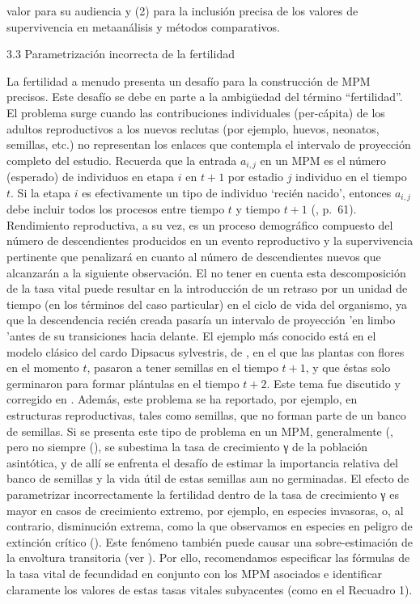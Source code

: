 \documentclass[
]{book}
\theoremstyle{definition}
\theoremstyle{definition}
\theoremstyle{definition}
\theoremstyle{definition}
\theoremstyle{remark}
\begin{document}
valor para su audiencia y (2) para la inclusión precisa de los valores de supervivencia en metaanálisis y métodos comparativos.

3.3 \textbar{} Parametrización incorrecta de la fertilidad

La fertilidad a menudo presenta un desafío para la construcción de MPM precisos. Este desafío se debe en parte a la ambigüedad del término ``fertilidad''. El problema surge cuando las contribuciones individuales (per-cápita) de los adultos reproductivos a los nuevos reclutas (por ejemplo, huevos, neonatos, semillas, etc.) no representan los enlaces que contempla el intervalo de proyección completo del estudio. Recuerda que la entrada \(a_{i,j}\) en un MPM es el número (esperado) de individuos en etapa \(i\) en \(t + 1\) por estadio \(j\) individuo en el tiempo \(t\). Si la etapa \(i\) es efectivamente un tipo de individuo `recién nacido', entonces \(a_{i,j}\) debe incluir todos los procesos entre tiempo \(t\) y tiempo \(t + 1\) (\citet{caswell2001matrix}, p.~61). Rendimiento reproductiva, a su vez, es un proceso demográfico compuesto del número de descendientes producidos en un evento reproductivo y la supervivencia pertinente que penalizará en cuanto al número de descendientes nuevos que alcanzarán a la siguiente observación. El no tener en cuenta esta descomposición de la tasa vital puede resultar en la introducción de un retraso por un unidad de tiempo (en los términos del caso particular) en el ciclo de vida del organismo, ya que la descendencia recién creada pasaría un intervalo de proyección 'en limbo 'antes de su transiciones hacia delante. El ejemplo más conocido está en el modelo clásico del cardo Dipsacus sylvestris, de \citet{werner1977population}, en el que las plantas con flores en el momento \(t\), pasaron a tener semillas en el tiempo \(t + 1\), y que éstas solo germinaron para formar plántulas en el tiempo \(t + 2\). Este tema fue discutido y corregido en \citet{caswell2001matrix}. Además, este problema se ha reportado, por ejemplo, en estructuras reproductivas, tales como semillas, que no forman parte de un banco de semillas. Si se presenta este tipo de problema en un MPM, generalmente (\citet{kendall2019persistent}, pero no siempre (\citet{nguyen2019consequences}), se subestima la tasa de crecimiento γ de la población asintótica, y de allí se enfrenta el desafío de estimar la importancia relativa del banco de semillas y la vida útil de estas semillas aun no germinadas. El efecto de parametrizar incorrectamente la fertilidad dentro de la tasa de crecimiento γ es mayor en casos de crecimiento extremo, por ejemplo, en especies invasoras, o, al contrario, disminución extrema, como la que observamos en especies en peligro de extinción crítico (\citet{steiner2021quantifying}). Este fenómeno también puede causar una sobre-estimación de la envoltura transitoria (ver \citet{ezard2010matrix}). Por ello, recomendamos especificar las fórmulas de la tasa vital de fecundidad en conjunto con los MPM asociados e identificar claramente los valores de estas tasas vitales subyacentes (como en el Recuadro 1).
\end{document}
